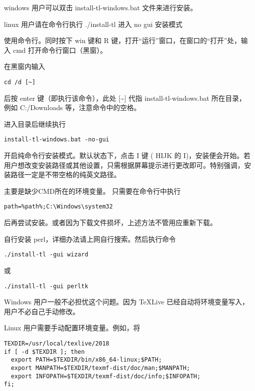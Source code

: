 
windows 用户可以双击 install-tl-windows.bat 文件来进行安装。

linux 用户请在命令行执行 ./install-tl 进入 no gui 安装模式



使用命令行。同时按下 win 键和 R
键，打开``运行''窗口，在窗口的``打开''处，输入 cmd
打开命令行窗口（黑窗）。

在黑窗内输入
\begin{verbatim}
cd /d [~]
\end{verbatim}

后按 enter 键（即执行该命令），此处 {[}\textasciitilde{}{]} 代指
install-tl-windows.bat 所在目录，例如 C:/Downloads
等，注意命令中的空格。

进入目录后继续执行
\begin{verbatim}
install-tl-windows.bat -no-gui
\end{verbatim}

开启纯命令行安装模式。默认状态下，点击 I 键 ( HIJK 的
I)，安装便会开始。若用户想改变安装路径或其他设置，只需根据屏幕提示进行更改即可。特别强调，安装路径一定是不带空格的纯英文路径。



主要是缺少CMD所在的环境变量。 只需要在命令行中执行
\begin{verbatim}
path=%path%;C:\Windows\system32
\end{verbatim}

后再尝试安装。或者因为下载文件损坏，上述方法不管用应重新下载。



自行安装 perl，详细办法请上网自行搜索。然后执行命令
\begin{verbatim}
./install-tl -gui wizard
\end{verbatim}
或
\begin{verbatim}
./install-tl -gui perltk
\end{verbatim}



Windows 用户一般不必担忧这个问题。因为 TeXLive
已经自动将环境变量写入，用户不必自己手动修改。

Linux 用户需要手动配置环境变量。例如，将
\begin{verbatim}
TEXDIR=/usr/local/texlive/2018
if [ -d $TEXDIR ]; then
  export PATH=$TEXDIR/bin/x86_64-linux;$PATH;
  export MANPATH=$TEXDIR/texmf-dist/doc/man;$MANPATH;
  export INFOPATH=$TEXDIR/texmf-dist/doc/info;$INFOPATH;
fi;
\end{verbatim}

